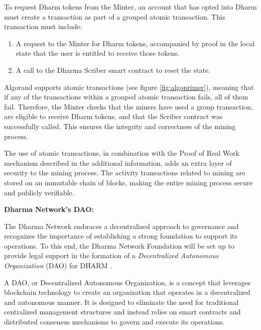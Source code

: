 To request Dharm tokens from the Minter, an account that has opted into Dharm must create a transaction as part of a grouped atomic transaction. This transaction must include:

\begin{enumerate}
    \item A request to the Minter for Dharm tokens, accompanied by proof in the local state that the user is entitled to receive those tokens.
    \item A call to the Dharma Scriber smart contract to reset the state.
\end{enumerate}

Algorand supports atomic transactions (see figure \ref{fig:algoprimer}), meaning that if any of the transactions within a grouped atomic transaction fails, all of them fail. Therefore, the Minter checks that the miners have used a group transaction, are eligible to receive Dharm tokens, and that the Scriber contract was successfully called. This ensures the integrity and correctness of the mining process.\newline

The use of atomic transactions, in combination with the Proof of Real Work mechanism described in the additional information, adds an extra layer of security to the mining process. The activity transactions related to mining are stored on an immutable chain of blocks, making the entire mining process secure and publicly verifiable.\newline


\textbf{Dharma Network's DAO:}\newline

The Dharma Network embraces a decentralized approach to governance and recognizes the importance of establishing a strong foundation to support its operations. To this end, the Dharma Network Foundation will be set up to provide legal support in the formation of a \textit{Decentralized Autonomous Organization} (DAO) for DHARM \cite{dharma}.\newline

A DAO, or Decentralized Autonomous Organization, is a concept that leverages blockchain technology to create an organization that operates in a decentralized and autonomous manner. It is designed to eliminate the need for traditional centralized management structures and instead relies on smart contracts and distributed consensus mechanisms to govern and execute its operations.\newline

